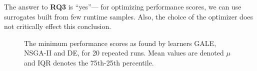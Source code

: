 \documentclass{sig-alternative}
\begin{document}
\begin{myshadowbox}
The answer to {\bf RQ3} is ``yes''--- for optimizing performance scores, we can use surrogates built from few runtime samples. Also, the choice of the optimizer does not critically effect this conclusion.
\end{myshadowbox}


\begin{figure}[h]
\caption{The minimum performance scores as found by learners GALE, NSGA-II and DE, for  20 repeated
runs. Mean values are denoted $\mu$ and IQR denotes the 75th-25th percentile.}
\label{fig:external_validity}
\end{figure}
\end{document}
